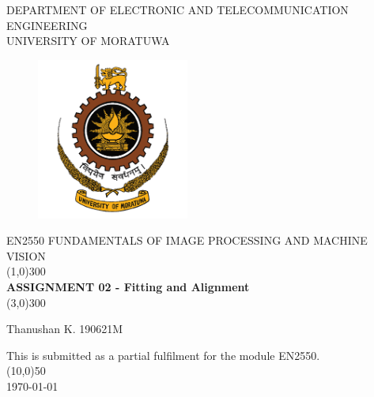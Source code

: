 \documentclass[11pt]{article}
\begin{document}
\begin{titlepage}
    
\begin{center}
    \vspace*{0cm}
    \textsc{\Large DEPARTMENT OF ELECTRONIC AND TELECOMMUNICATION ENGINEERING\\
    [2mm]
    UNIVERSITY OF MORATUWA}\\
    [0.75cm]
    \begin{figure}[htp]
    \centering
    \includegraphics[width=5cm]{UoMLOGO.png}
    \label{fig:galaxy}
    \end{figure}

    \textsc{\Large EN2550 FUNDAMENTALS OF IMAGE PROCESSING AND MACHINE VISION}\\
    [5mm]
    \line(1,0){300}\\
    [1mm]
    \huge{\bfseries  ASSIGNMENT 02 - Fitting and Alignment} \\
    \line(3,0){300}\\
[1.2cm]  
\end{center}
\begin{center}
    Thanushan K.
    \hspace*{1cm}
    190621M
\end{center}
\vspace*{1cm}
\begin{center}
    This is submitted as a partial fulfilment for the module EN2550.\\
    \line(10,0){50}\\
    [0.5cm]
    \today
    \end{center}
\end{titlepage}
\end{document}
